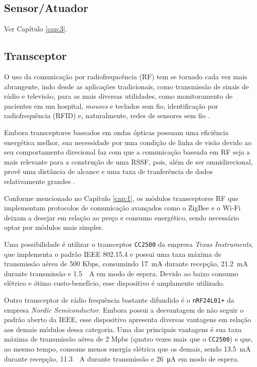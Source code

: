 \subsection{Sensor/Atuador}
Ver Capítulo \ref{cap:3}.

\subsection{Transceptor}
O uso da comunicação por radiofrequcência (RF) tem se tornado cada vez mais abrangente, indo desde as
aplicações tradicionais, como transmissão de sinais de rádio e televisão, para as mais diversas utilidades,
como monitoramento de pacientes em um hospital, \textit{mouses} e teclados sem fio, identificação por
radiofrequência (RFID) e, naturalmente, redes de sensores sem fio \cite{misra2001}.

Embora transceptores baseados em ondas ópticas possuam uma eficiência energética melhor, sua necessidade por
uma condição de linha de visão devido ao seu comportamento direcional faz com que a comunicação baseada em RF
seja a mais relevante para a construção de uma RSSF, pois, além de ser omnidirecional, provê uma distância de
alcance e uma taxa de tranferência de dados relativamente grandes \cite{kuorilehto2007,karl_willig2005}.

Conforme mencionado no Capítulo \ref{cap:1}, os módulos transceptores RF que implementam protocolos de
comunicação avançados como o ZigBee e o Wi-Fi deixam a desejar em relação ao preço e consumo energético,
sendo necessário optar por módulos mais simples.

Uma possibilidade é utilizar o transceptor \texttt{CC2500} da empresa \textit{Texas Instruments}, que
implementa o padrão IEEE 802.15.4 e possui uma taxa máxima de transmissão aérea de 500 Kbps, consumindo
\SI{17}{\milli \ampere} durante recepção, \SI{21.2}{\milli \ampere} durante transmissão e \SI{1.5}{\milli
\ampere} em modo de espera. Devido ao baixo consumo elétrico e ótimo custo-benefício, esse dispositivo é
amplamente utilizado. \cite{ccdatasheet}

Outro transceptor de rádio frequência bastante difundido é o \texttt{nRF24L01+} da empresa \textit{Nordic
Semiconductor}. Embora possui a desvantagem de não seguir o padrão aberto da IEEE, esse dispositivo apresenta
diversas vantagens em relação aos demais módulos dessa categoria. Uma das principais vantagens é sua taxa
máxima de transmissão aérea de 2 Mpbs (quatro vezes mais que o \texttt{CC2500}) e que, ao mesmo tempo, consome
menos energia elétrica que os demais, sendo \SI{13.5}{\milli \ampere} durante recepção, \SI{11.3}{\milli
\ampere} durante transmissão e \SI{26}{\micro \ampere} em modo de espera. \cite{nrfdatasheet}

